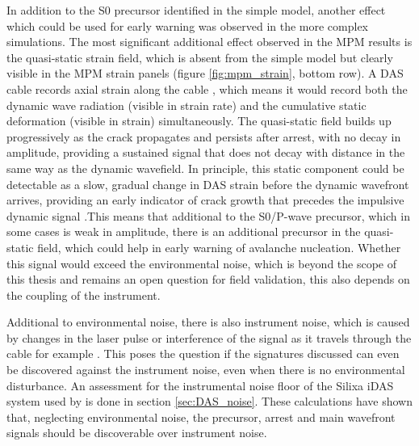 In addition to the S0 precursor identified in the simple model, another effect which could be used for early warning was observed in the more complex simulations. The most significant additional effect observed in the MPM results is the quasi-static strain field, which is absent from the simple model but
clearly visible in the MPM strain panels (figure \ref{fig:mpm_strain},
bottom row). A DAS cable records axial strain along the cable
\parencite{hartogIntroductionDistributedOptical2017}, which means it
would record both the dynamic wave radiation (visible in strain rate)
and the cumulative static deformation (visible in strain) simultaneously.
The quasi-static field builds up progressively as the crack propagates
and persists after arrest, with no decay in amplitude, providing a sustained signal that does not decay with distance in the same way as the dynamic wavefield. In principle, this static component could be detectable as a slow, gradual change in DAS strain before the dynamic wavefront arrives, providing an early indicator of crack growth that precedes the impulsive dynamic signal \parencite{freundDynamicFractureMechanics1998,
heierliAnticrackNucleationTriggering2008}.This means that additional to the S0/P-wave precursor, which in some cases is weak in amplitude, there is an additional precursor in the quasi-static field, which could help in early warning of avalanche nucleation. Whether this signal would
exceed the environmental noise, which is beyond the scope of this
thesis and remains an open question for field validation, this also depends on the coupling of the instrument. \par 

Additional to environmental noise, there is also instrument noise, which is caused by changes in the laser pulse or interference of the signal as it travels through the cable for example \parencite{lindseyFiberOpticSeismology2021}. This poses the question if the signatures discussed can even be discovered against the instrument noise, even when there is no environmental disturbance. An assessment for the instrumental noise floor of the Silixa iDAS system used by \cite{paitzPhenomenologyAvalancheRecordings2023} is done in section \ref{sec:DAS_noise}. These calculations have shown that, neglecting environmental noise, the precursor, arrest and main wavefront signals should be discoverable over instrument noise. \par

